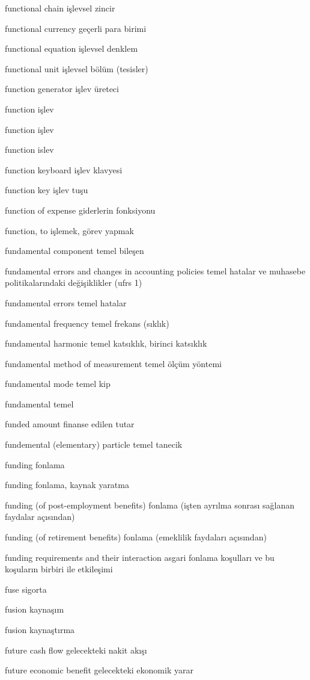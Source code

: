 \documentclass[12pt,fleqn]{article}\usepackage{../../common}
\begin{document}
functional chain işlevsel zincir

functional currency geçerli para birimi

functional equation işlevsel denklem

functional unit işlevsel bölüm (tesisler)

function generator işlev üreteci

function işlev

function işlev

function islev

function keyboard işlev klavyesi

function key işlev tuşu

function of expense giderlerin fonksiyonu

function, to işlemek, görev yapmak

fundamental component temel bileşen

fundamental errors and changes in accounting policies temel hatalar ve muhasebe politikalarındaki değişiklikler (ufrs 1)

fundamental errors temel hatalar

fundamental frequency temel frekans (sıklık)

fundamental harmonic temel katsıklık, birinci katsıklık

fundamental method of measurement temel ölçüm yöntemi

fundamental mode temel kip

fundamental temel

funded amount finanse edilen tutar

fundemental (elementary) particle temel tanecik

funding fonlama

funding fonlama, kaynak yaratma

funding (of post-employment benefits) fonlama (işten ayrılma sonrası sağlanan faydalar açısından)

funding (of retirement benefits) fonlama (emeklilik faydaları açısından)

funding requirements and their interaction asgari fonlama koşulları ve bu koşuların birbiri ile etkileşimi

fuse sigorta

fusion kaynaşım

fusion kaynaştırma

future cash flow gelecekteki nakit akışı

future economic benefit gelecekteki ekonomik yarar
\end{document}

